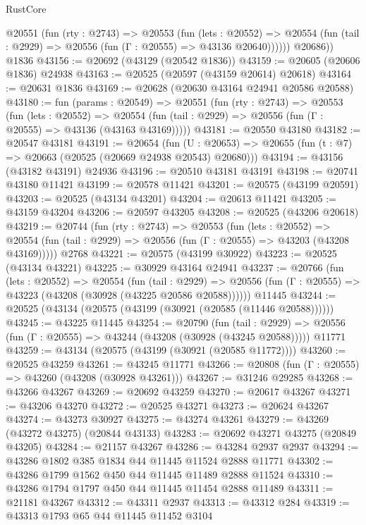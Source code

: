 \begin{lexlean}{RustCore}
\begin{coremodule}
          @20551
            (fun (rty : @2743) =>
            @20553
              (fun (lets : @20552) =>
              @20554 (fun (tail : @2929) => @20556 (fun (Γ : @20555) => @43136 @20640))))))
        @20686))
    @1836
@43156 := @20692 (@43129 (@20542 @1836))
@43159 := @20605 (@20606 @1836) @24938
@43163 := @20525 (@20597 (@43159 @20614) @20618)
@43164 := @20631 @1836
@43169 := @20628 (@20630 @43164 @24941 @20586 @20588)
@43180 := fun (params : @20549) =>
  @20551
    (fun (rty : @2743) =>
    @20553
      (fun (lets : @20552) =>
      @20554 (fun (tail : @2929) => @20556 (fun (Γ : @20555) => @43136 (@43163 @43169)))))
@43181 := @20550 @43180
@43182 := @20547 @43181
@43191 := @20654
    (fun (U : @20653) => @20655 (fun (t : @7) => @20663 (@20525 (@20669 @24938 @20543) @20680)))
@43194 := @43156 (@43182 @43191) @24936
@43196 := @20510 @43181 @43191
@43198 := @20741 @43180 @11421
@43199 := @20578 @11421
@43201 := @20575 (@43199 @20591)
@43203 := @20525 (@43134 @43201)
@43204 := @20613 @11421
@43205 := @43159 @43204
@43206 := @20597 @43205
@43208 := @20525 (@43206 @20618)
@43219 := @20744
    (fun (rty : @2743) =>
    @20553
      (fun (lets : @20552) =>
      @20554 (fun (tail : @2929) => @20556 (fun (Γ : @20555) => @43203 (@43208 @43169)))))
    @2768
@43221 := @20575 (@43199 @30922)
@43223 := @20525 (@43134 @43221)
@43225 := @30929 @43164 @24941
@43237 := @20766
    (fun (lets : @20552) =>
    @20554
      (fun (tail : @2929) =>
      @20556 (fun (Γ : @20555) => @43223 (@43208 (@30928 (@43225 @20586 @20588))))))
    @11445
@43244 := @20525 (@43134 (@20575 (@43199 (@30921 (@20585 (@11446 @20588))))))
@43245 := @43225 @11445
@43254 := @20790
    (fun (tail : @2929) => @20556 (fun (Γ : @20555) => @43244 (@43208 (@30928 (@43245 @20588)))))
    @11771
@43259 := @43134 (@20575 (@43199 (@30921 (@20585 @11772))))
@43260 := @20525 @43259
@43261 := @43245 @11771
@43266 := @20808 (fun (Γ : @20555) => @43260 (@43208 (@30928 @43261)))
@43267 := @31246 @29285
@43268 := @43266 @43267
@43269 := @20692 @43259
@43270 := @20617 @43267
@43271 := @43206 @43270
@43272 := @20525 @43271
@43273 := @20624 @43267
@43274 := @43273 @30927
@43275 := @43274 @43261
@43279 := @43269 (@43272 @43275) (@20844 @43133)
@43283 := @20692 @43271 @43275 (@20849 @43205)
@43284 := @21157 @43267
@43286 := @43284 @2937 @2937
@43294 := @43286 @1802 @385 @1834 @44 @11445 @11524 @2888 @11771
@43302 := @43286 @1799 @1562 @450 @44 @11445 @11489 @2888 @11524
@43310 := @43286 @1794 @1797 @450 @44 @11445 @11454 @2888 @11489
@43311 := @21181 @43267
@43312 := @43311 @2937
@43313 := @43312 @284
@43319 := @43313 @1793 @65 @44 @11445 @11452 @3104

\end{coremodule}
\end{lexlean}
